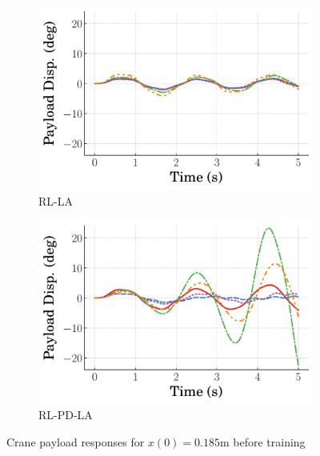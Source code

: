 \begin{figure}[tb]
\begin{subfigure}[b]{0.49\textwidth}
        \centering
        \includegraphics[width=\textwidth]{figures/figures_RL_model_based_control/time_responses_crane/dpcrane_RL_LA/Payload_displacement_0p185_init_0_steps.pdf}
        \caption{RL-LA}
        \label{subfig_chap2:dpcrane_payload_resp_0steps_RL_LA}
    \end{subfigure}
    \hfill
    \begin{subfigure}[b]{0.49\textwidth}
        \centering
        \includegraphics[width=\textwidth]{figures/figures_RL_model_based_control/time_responses_crane/dpcrane_RL_PD_LA/Payload_displacement_0p185_init_0_steps.pdf}
        \caption{RL-PD-LA}
        \label{subfig_chap2:dpcrane_payload_resp_0steps_RL_PD_LA}
    \end{subfigure}
    \hfill
    \caption{Crane payload responses for $x(0)=0.185\si{\meter}$ before training}
    \label{fig_chap2:dpcrane_payload_resp_0steps}
\end{figure}

